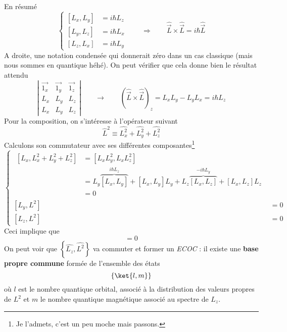 	En résumé
	\begin{equation}
	\left\{\begin{array}{ll}
	\left[L_x,L_y\right] &= i\hbar L_z\\
	\left[L_y,L_z\right] &= i\hbar L_x\\
	\left[L_z,L_x\right] &= i\hbar L_y		
	\end{array}\right.\qquad\Longrightarrow\qquad \hat{\vec{L}}\times\hat{\vec{L}} = i\hbar
	\hat{\vec{L}}
	\end{equation}
	A droite, une notation condensée qui donnerait zéro dans un cas classique (mais nous sommes 
	en quantique héhé). On peut vérifier que cela donne bien le résultat attendu
	\begin{equation}
	\left|\begin{array}{ccc}
	\vec{1_x} & \vec{1_y} & \vec{1_z}\\
	L_x & L_y & L_z\\
	L_x & L_y & L_z	
	\end{array}\right|\qquad \longrightarrow \qquad(\hat{\vec{L}}\times\hat{\vec{L}})_z = L_xL_y-L_yL_x
	 = i\hbar L_z
	\end{equation}
	Pour la composition, on s'intéresse à l'opérateur suivant
	\begin{equation}
	\hat{L}^2 \equiv \hat{L_x^2}+\hat{L_y^2}+\hat{L_z^2}
	\end{equation}
	Calculons son commutateur avec ses différentes composantes\footnote{Je l'admets, c'est un peu 
	moche mais passons.}
	\begin{equation}
	\left\{\begin{array}{ll}
	\begin{array}{ll}
	\left[L_x,L_x^2+L_y^2+L_z^2\right] &= \left[L_xL_y^2, L_xL_z^2\right]\\
	&= L_y\overbrace{\left[L_x,L_y\right]}^{i\hbar L_z}+\left[L_x,L_y\right]L_y + L_z\overbrace{\left[L_x,L_z\right]}^{-i\hbar L_y}
	+\left[L_x,L_z\right]L_z\\
	&= 0
	\end{array}\\
	\left[L_y,L^2\right] &= 0\\
	\left[L_z,L^2\right] &= 0
	\end{array}\right.
	\end{equation}
	Ceci implique que
	\begin{equation}
	[\hat{\vec{L}},L^2] = 0
	\end{equation}
	On peut voir que $\left\{\hat{L_z},\hat{L^2}\right\}$ va commuter et former un \textit{ECOC} 
	: il existe une \textbf{base propre commune} formée de l'ensemble des états
	\begin{equation}
	\left\{\ket{l,m}\right\}
	\end{equation}
	où $l$ est le nombre quantique orbital, associé à la distribution des valeurs propres
	 de $L^2$ et $m$ le nombre quantique magnétique associé au spectre de $L_z$. 


